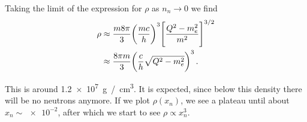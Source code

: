 \documentclass[main.tex]{subfiles}
\begin{document}
Taking the limit of the expression for  \(\rho \) as \(n_n \to 0\) we find 
%
\begin{align}
\rho &\approx \frac{m 8 \pi }{3} \qty(\frac{mc}{h})^3 \qty[ \frac{Q^2 - m_e^2}{m^2}]^{3/2}  \\
&\approx \frac{8 \pi m}{3} \qty( \frac{c}{h}\sqrt{Q^2 - m_e^2})^3 
\,.
\end{align}

This is around \SI{1.2e7}{g / cm^3}. It is expected, since below this density there will be no neutrons anymore. 
If we plot \(\rho (x_n)\), we see a plateau until about \(x_n \sim \num{e-2}\), after which we start to see \(\rho \propto x_n^3\).
\end{document}
